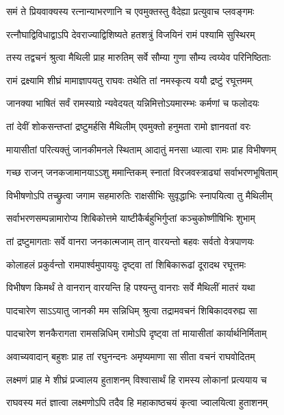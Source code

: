 \twolineshloka
{समं ते प्रियवाक्यस्य रत्नान्याभरणानि च}
{एवमुक्तस्तु वैदेह्या प्रत्युवाच प्लवङ्गमः} %

\twolineshloka
{रत्नौघाद्विविधाद्वाऽपि देवराज्याद्विशिष्यते}
{हतशत्रुं विजयिनं रामं पश्यामि सुस्थिरम्} %

\twolineshloka
{तस्य तद्वचनं श्रुत्वा मैथिली प्राह मारुतिम्}
{सर्वे सौम्या गुणा सौम्य त्वय्येव परिनिष्ठिताः} %

\twolineshloka
{रामं द्रक्ष्यामि शीघ्रं मामाज्ञापयतु राघवः}
{तथेति तां नमस्कृत्य ययौ द्रष्टुं रघूत्तमम्} %

\twolineshloka
{जानक्या भाषितं सर्वं रामस्याग्रे न्यवेदयत्}
{यन्निमित्तोऽयमारम्भः कर्मणां च फलोदयः} %

\twolineshloka
{तां देवीं शोकसन्तप्तां द्रष्टुमर्हसि मैथिलीम्}
{एवमुक्तो हनुमता रामो ज्ञानवतां वरः} %

\twolineshloka
{मायासीतां परित्यक्तुं जानकीमनले स्थिताम्}
{आदातुं मनसा ध्यात्वा रामः प्राह विभीषणम्} %

\twolineshloka
{गच्छ राजन् जनकजामानयाऽऽशु ममान्तिकम्}
{स्नातां विरजवस्त्राढ्यां सर्वाभरणभूषिताम्} %

\twolineshloka
{विभीषणोऽपि तच्छ्रुत्वा जगाम सहमारुतिः}
{राक्षसीभिः सुवृद्धाभिः स्नापयित्वा तु मैथिलीम्} %

\twolineshloka
{सर्वाभरणसम्पन्नामारोप्य शिबिकोत्तमे}
{याष्टीकैर्बहुभिर्गुप्तां कञ्चुकोष्णीषिभिः शुभाम्} %

\twolineshloka
{तां द्रष्टुमागताः सर्वे वानरा जनकात्मजाम्}
{तान् वारयन्तो बहवः सर्वतो वेत्रपाणयः} %

\twolineshloka
{कोलाहलं प्रकुर्वन्तो रामपार्श्वमुपाययुः}
{दृष्ट्वा तां शिबिकारूढां दूरादथ रघूत्तमः} %

\twolineshloka
{विभीषण किमर्थं ते वानरान् वारयन्ति हि}
{पश्यन्तु वानराः सर्वे मैथिलीं मातरं यथा} %

\twolineshloka
{पादचारेण साऽऽयातु जानकी मम सन्निधिम्}
{श्रुत्वा तद्रामवचनं शिबिकादवरुह्य सा} %

\twolineshloka
{पादचारेण शनकैरागता रामसन्निधिम्}
{रामोऽपि दृष्ट्वा तां मायासीतां कार्यार्थनिर्मिताम्} %

\twolineshloka
{अवाच्यवादान् बहुशः प्राह तां रघुनन्दनः}
{अमृष्यमाणा सा सीता वचनं राघवोदितम्} %

\twolineshloka
{लक्ष्मणं प्राह मे शीघ्रं प्रज्वालय हुताशनम्}
{विश्वासार्थं हि रामस्य लोकानां प्रत्ययाय च} %

\twolineshloka
{राघवस्य मतं ज्ञात्वा लक्ष्मणोऽपि तदैव हि}
{महाकाष्ठचयं कृत्वा ज्वालयित्वा हुताशनम्} %

